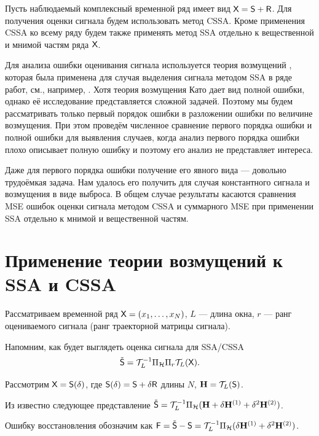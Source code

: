 \documentclass[specialist,
               substylefile = spbu.rtx,
               subf,href,colorlinks=true, 12pt]{disser}
\begin{document}
Пусть наблюдаемый комплексный временной ряд имеет вид $\textsf{X} =\textsf{S} + \textsf{R}$. Для получения оценки сигнала будем использовать метод CSSA. Кроме применения CSSA ко всему ряду будем также применять метод SSA отдельно к вещественной и мнимой частям ряда $\textsf{X}$.

Для анализа ошибки оценивания сигнала используется теория возмущений \cite{Kato}, которая была применена для случая выделения сигнала методом SSA в ряде работ, см., например, \cite{Nekrutkin}.
Хотя теория возмущения Като дает вид полной ошибки, однако её исследование представляется сложной задачей. Поэтому мы будем рассматривать только первый порядок ошибки в разложении ошибки по величине возмущения.
При этом проведём численное сравнение первого порядка ошибки и полной ошибки для выявления случаев, когда анализ первого порядка ошибки плохо описывает полную ошибку и поэтому его анализ не представляет интереса.

Даже для первого порядка ошибки получение его явного вида --- довольно трудоёмкая задача. Нам удалось его получить для случая константного сигнала и возмущения в виде выброса. В общем случае результаты касаются сравнения MSE ошибок оценки сигнала методом CSSA и суммарного MSE при применении SSA отдельно к мнимой и вещественной частям.


\section{Применение теории возмущений к SSA и CSSA}

Рассматриваем временной ряд $\textsf{X}=(x_1, \ldots, x_{N})$, $L$ --- длина окна, $r$ --- ранг оцениваемого сигнала (ранг траекторной матрицы сигнала).

Напомним, как будет выглядеть оценка сигнала для SSA/CSSA
	\begin{equation*}
		\tilde{\textsf{S}} = \mathcal{T}^{-1}_{L} \Pi_{\mathcal{H}} \Pi_{r} \mathcal{T}_L (\textsf{X}).
	\end{equation*}

Рассмотрим $\textsf{X} = \textsf{S}(\delta)$, где $\textsf{S}(\delta) = \textsf{S} + \delta \textsf{R}$ длины $N$, $\mathbf{H} = \mathcal{T}_L(\textsf{S})$.

Из \cite{Nekr2008} известно следующее представление $\tilde{\textsf{S}} = \mathcal{T}_L^{-1} \Pi_{\mathcal{H}} (\mathbf{H} + \delta\mathbf{H}^{(1)} + \delta^2\mathbf{H}^{(2)})$.

Ошибку восстановления обозначим как $\textsf{F} = \tilde{\textsf{S}} - \textsf{S} = \mathcal{T}_L^{-1} \Pi_{\mathcal{H}} (\delta\mathbf{H}^{(1)} + \delta^2\mathbf{H}^{(2)})$.
\end{document}
